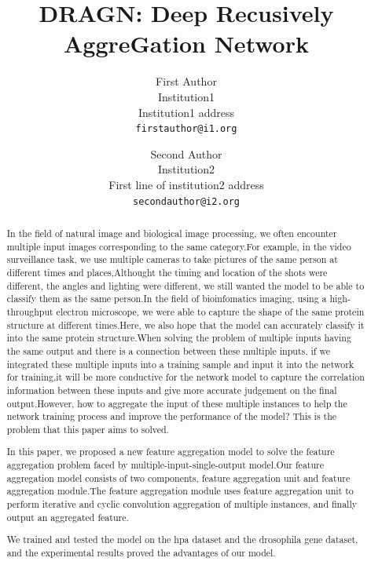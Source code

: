 \documentclass[10pt,twocolumn,letterpaper]{article}
\begin{document}
\title{DRAGN: Deep Recusively AggreGation Network}

\author{First Author\\
Institution1\\
Institution1 address\\
{\tt\small firstauthor@i1.org}
\and
Second Author\\
Institution2\\
First line of institution2 address\\
{\tt\small secondauthor@i2.org}
}

\maketitle

\begin{abstract}
In the field of natural image and biological image processing, we often encounter multiple input images corresponding to the same category.For example, in the video surveillance task, we use multiple cameras to take pictures of the same person at different times and places,Althought the timing and location of the shots were different, the angles and lighting were different, we still wanted the model to be able to classify them as the same person.In the field of bioinfomatics imaging, using a high-throughput electron microscope, we were able to capture the shape of the same protein structure at different times.Here, we also hope that the model can accurately classify it into the same protein structure.When solving the problem of multiple inputs having the same output and there is a connection between these multiple inputs, if we integrated these multiple inputs into a training sample and input it into the network for training,it will be more conductive for the network model to capture the correlation information between these inputs and give more accurate judgement on the final output.However, how to aggregate the input of these multiple instances to help the network training process and improve the performance of the model? This is the problem that this paper aims to solved.

In this paper, we proposed a new feature aggregation model to solve the feature aggregation problem faced by multiple-input-single-output model.Our feature aggregation model consists of two components, feature aggregation unit and feature aggregation module.The feature aggregation module uses feature aggregation unit to perform iterative and cyclic convolution aggregation of multiple instances, and finally output an aggregated feature.

We trained and tested the model on the hpa dataset and the drosophila gene dataset, and the experimental results proved the advantages of our model.

\end{abstract}
\end{document}
